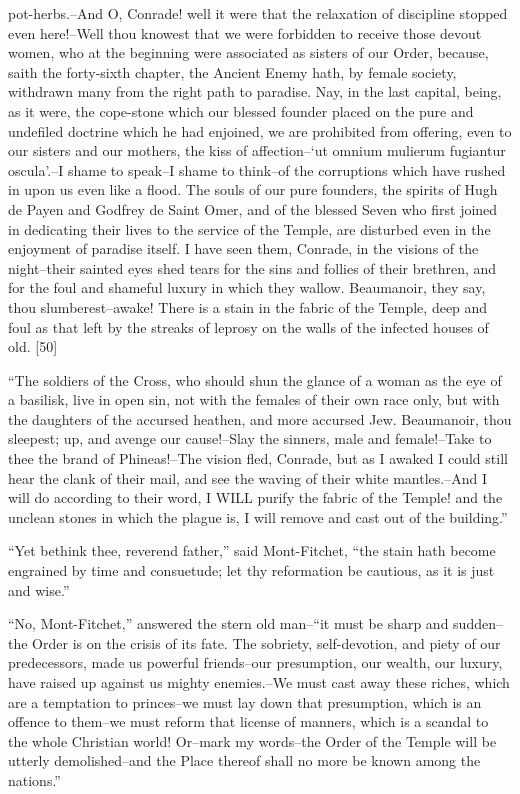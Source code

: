 pot-herbs.--And O, Conrade! well it were that the relaxation of
discipline stopped even here!--Well thou knowest that we were forbidden
to receive those devout women, who at the beginning were associated as
sisters of our Order, because, saith the forty-sixth chapter, the
Ancient Enemy hath, by female society, withdrawn many from the right
path to paradise. Nay, in the last capital, being, as it were, the
cope-stone which our blessed founder placed on the pure and undefiled
doctrine which he had enjoined, we are prohibited from offering, even to
our sisters and our mothers, the kiss of affection--`ut omnium mulierum
fugiantur oscula'.--I shame to speak--I shame to think--of the
corruptions which have rushed in upon us even like a flood. The souls of
our pure founders, the spirits of Hugh de Payen and Godfrey de Saint
Omer, and of the blessed Seven who first joined in dedicating their
lives to the service of the Temple, are disturbed even in the enjoyment
of paradise itself. I have seen them, Conrade, in the visions of the
night--their sainted eyes shed tears for the sins and follies of their
brethren, and for the foul and shameful luxury in which they wallow.
Beaumanoir, they say, thou slumberest--awake! There is a stain in the
fabric of the Temple, deep and foul as that left by the streaks of
leprosy on the walls of the infected houses of old. {[}50{]}

``The soldiers of the Cross, who should shun the glance of a woman as
the eye of a basilisk, live in open sin, not with the females of their
own race only, but with the daughters of the accursed heathen, and more
accursed Jew. Beaumanoir, thou sleepest; up, and avenge our cause!--Slay
the sinners, male and female!--Take to thee the brand of Phineas!--The
vision fled, Conrade, but as I awaked I could still hear the clank of
their mail, and see the waving of their white mantles.--And I will do
according to their word, I WILL purify the fabric of the Temple! and the
unclean stones in which the plague is, I will remove and cast out of the
building.''

``Yet bethink thee, reverend father,'' said Mont-Fitchet, ``the stain
hath become engrained by time and consuetude; let thy reformation be
cautious, as it is just and wise.''

``No, Mont-Fitchet,'' answered the stern old man--``it must be sharp and
sudden--the Order is on the crisis of its fate. The sobriety,
self-devotion, and piety of our predecessors, made us powerful
friends--our presumption, our wealth, our luxury, have raised up against
us mighty enemies.--We must cast away these riches, which are a
temptation to princes--we must lay down that presumption, which is an
offence to them--we must reform that license of manners, which is a
scandal to the whole Christian world! Or--mark my words--the Order of
the Temple will be utterly demolished--and the Place thereof shall no
more be known among the nations.''

